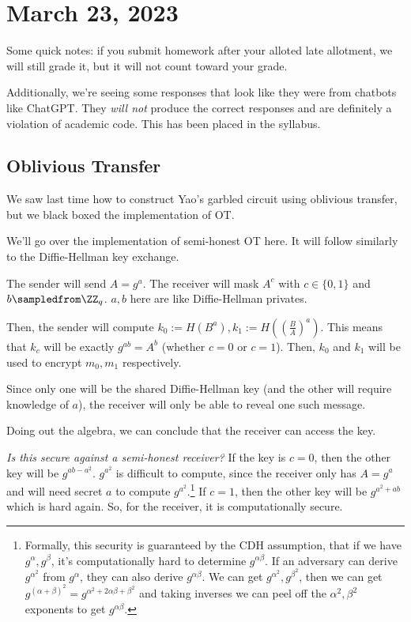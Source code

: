 \section{March 23, 2023}
\label{20230323}
Some quick notes: if you submit homework after your alloted late allotment, we will still grade it, but it will not count toward your grade.

Additionally, we're seeing some responses that look like they were from chatbots like ChatGPT. They \emph{will not} produce the correct responses and are definitely a violation of academic code. This has been placed in the syllabus.

\subsection{Oblivious Transfer}
We saw last time how to construct Yao's garbled circuit using oblivious transfer, but we black boxed the implementation of OT.

We'll go over the implementation of semi-honest OT here. It will follow similarly to the Diffie-Hellman key exchange.


The sender will send $A = g^a$. The receiver will mask $A^c$ with $c\in \{0,1\}$ and $b\sampledfrom \ZZ_q$. $a,b$ here are like Diffie-Hellman privates.

Then, the sender will compute $k_0 := H(B^a), k_1 := H\left( \left( \frac{B}{A} \right)^a \right)$. This means that $k_c$ will be exactly $g^{ab} = A^b$ (whether $c = 0$ or $c = 1$). Then, $k_0$ and $k_1$ will be used to encrypt $m_0, m_1$ respectively.

Since only one will be the shared Diffie-Hellman key (and the other will require knowledge of $a$), the receiver will only be able to reveal one such message.

Doing out the algebra, we can conclude that the receiver can access the key.


\emph{Is this secure against a semi-honest receiver?} If the key is $c = 0$, then the other key will be $g^{ab-a^2}$. $g^{a^2}$ is difficult to compute, since the receiver only has $A = g^a$ and will need secret $a$ to compute $g^{a^2}$.\footnote{Formally, this security is guaranteed by the CDH assumption, that if we have $g^{\alpha}, g^{\beta}$, it's computationally hard to determine $g^{\alpha\beta}$. If an adversary can derive $g^{\alpha^2}$ from $g^{\alpha}$, they can also derive $g^{\alpha\beta}$. We can get $g^{\alpha^2}, g^{\beta^2}$, then we can get $g^{(\alpha+\beta)^2}=g^{\alpha^2 + 2\alpha\beta + \beta^2}$ and taking inverses we can peel off the $\alpha^2,\beta^2$ exponents to get $g^{\alpha\beta}$.} If $c = 1$, then the other key will be $g^{a^2 + ab}$ which is hard again. So, for the receiver, it is computationally secure.

